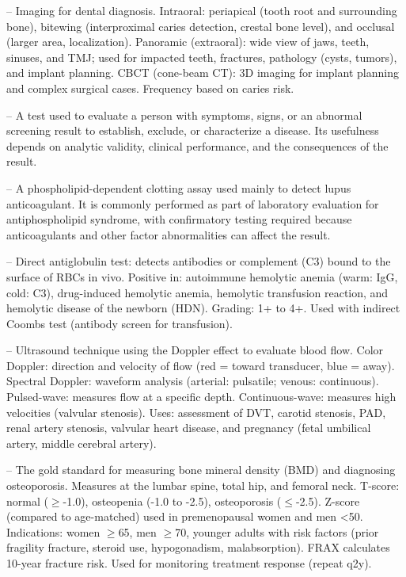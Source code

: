 -- Imaging for dental diagnosis. Intraoral: periapical (tooth root and surrounding bone), bitewing (interproximal caries detection, crestal bone level), and occlusal (larger area, localization). Panoramic (extraoral): wide view of jaws, teeth, sinuses, and TMJ; used for impacted teeth, fractures, pathology (cysts, tumors), and implant planning. CBCT (cone-beam CT): 3D imaging for implant planning and complex surgical cases. Frequency based on caries risk.

-- A test used to evaluate a person with symptoms, signs, or an abnormal screening result to establish, exclude, or characterize a disease. Its usefulness depends on analytic validity, clinical performance, and the consequences of the result.

-- A phospholipid-dependent clotting assay used mainly to detect lupus anticoagulant. It is commonly performed as part of laboratory evaluation for antiphospholipid syndrome, with confirmatory testing required because anticoagulants and other factor abnormalities can affect the result.

-- Direct antiglobulin test: detects antibodies or complement (C3) bound to the surface of RBCs in vivo. Positive in: autoimmune hemolytic anemia (warm: IgG, cold: C3), drug-induced hemolytic anemia, hemolytic transfusion reaction, and hemolytic disease of the newborn (HDN). Grading: 1+ to 4+. Used with indirect Coombs test (antibody screen for transfusion).

-- Ultrasound technique using the Doppler effect to evaluate blood flow. Color Doppler: direction and velocity of flow (red = toward transducer, blue = away). Spectral Doppler: waveform analysis (arterial: pulsatile; venous: continuous). Pulsed-wave: measures flow at a specific depth. Continuous-wave: measures high velocities (valvular stenosis). Uses: assessment of DVT, carotid stenosis, PAD, renal artery stenosis, valvular heart disease, and pregnancy (fetal umbilical artery, middle cerebral artery).

-- The gold standard for measuring bone mineral density (BMD) and diagnosing osteoporosis. Measures at the lumbar spine, total hip, and femoral neck. T-score: normal (\(\ge\)-1.0), osteopenia (-1.0 to -2.5), osteoporosis (\(\le\)-2.5). Z-score (compared to age-matched) used in premenopausal women and men <50. Indications: women \(\ge\)65, men \(\ge\)70, younger adults with risk factors (prior fragility fracture, steroid use, hypogonadism, malabsorption). FRAX calculates 10-year fracture risk. Used for monitoring treatment response (repeat q2y).

